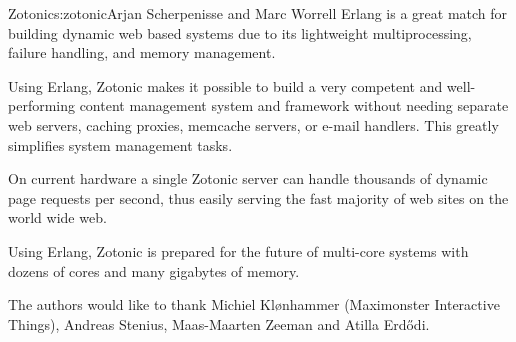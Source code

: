 \begin{aosachapter}{Zotonic}{s:zotonic}{Arjan Scherpenisse and Marc Worrell}
Erlang is a great match for building dynamic web based systems due to
its lightweight multiprocessing, failure handling, and memory
management.

Using Erlang, Zotonic makes it possible to build a very competent and
well-performing content management system and framework without needing
separate web servers, caching proxies, memcache servers, or e-mail
handlers. This greatly simplifies system management tasks.

On current hardware a single Zotonic server can handle thousands of
dynamic page requests per second, thus easily serving the fast majority
of web sites on the world wide web.

Using Erlang, Zotonic is prepared for the future of multi-core systems
with dozens of cores and many gigabytes of memory.


The authors would like to thank Michiel Klønhammer (Maximonster
Interactive Things), Andreas Stenius, Maas-Maarten Zeeman and Atilla
Erdődi.

\end{aosachapter}
